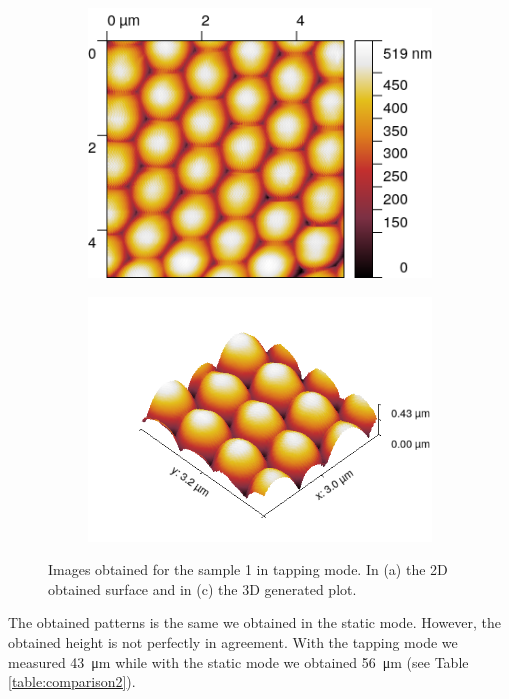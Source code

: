 \documentclass[11pt,a4paper]{article}
\begin{document}
\begin{figure}[H]
\centering
\begin{subfigure}[b]{0.45\textwidth}
\includegraphics[width=\textwidth]{tm_sample1}
\caption{}
\end{subfigure}
\begin{subfigure}[b]{0.45\textwidth}
\includegraphics[width=\textwidth]{tm_sample1_3D}
\caption{}
\end{subfigure}
\caption{Images obtained for the sample 1 in tapping mode. In (a) the 2D obtained surface and in (c) the 3D generated plot.}
\label{fig:tapping_sample1}
\end{figure}

The obtained patterns is the same we obtained in the static mode. However, the obtained height is not perfectly in agreement. With the tapping mode we measured \SI{43}{\micro\m} while with the static mode we obtained \SI{56}{\micro\m} (see Table \ref{table:comparison2}).
\end{document}
